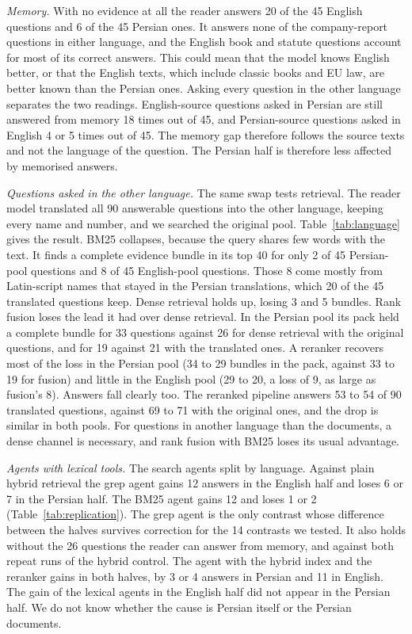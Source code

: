 \emph{Memory.} With no evidence at all the reader answers 20 of the 45 English questions and 6 of the 45 Persian ones. It answers none of the company-report questions in either language, and the English book and statute questions account for most of its correct answers. This could mean that the model knows English better, or that the English texts, which include classic books and EU law, are better known than the Persian ones. Asking every question in the other language separates the two readings. English-source questions asked in Persian are still answered from memory 18 times out of 45, and Persian-source questions asked in English 4 or 5 times out of 45. The memory gap therefore follows the source texts and not the language of the question. The Persian half is therefore less affected by memorised answers.

\emph{Questions asked in the other language.} The same swap tests retrieval. The reader model translated all 90 answerable questions into the other language, keeping every name and number, and we searched the original pool. Table~\ref{tab:language} gives the result. BM25 collapses, because the query shares few words with the text. It finds a complete evidence bundle in its top 40 for only 2 of 45 Persian-pool questions and 8 of 45 English-pool questions. Those 8 come mostly from Latin-script names that stayed in the Persian translations, which 20 of the 45 translated questions keep. Dense retrieval holds up, losing 3 and 5 bundles. Rank fusion loses the lead it had over dense retrieval. In the Persian pool its pack held a complete bundle for 33 questions against 26 for dense retrieval with the original questions, and for 19 against 21 with the translated ones. A reranker recovers most of the loss in the Persian pool (34 to 29 bundles in the pack, against 33 to 19 for fusion) and little in the English pool (29 to 20, a loss of 9, as large as fusion's 8). Answers fall clearly too. The reranked pipeline answers 53 to 54 of 90 translated questions, against 69 to 71 with the original ones, and the drop is similar in both pools. For questions in another language than the documents, a dense channel is necessary, and rank fusion with BM25 loses its usual advantage.

\emph{Agents with lexical tools.} The search agents split by language. Against plain hybrid retrieval the grep agent gains 12 answers in the English half and loses 6 or 7 in the Persian half. The BM25 agent gains 12 and loses 1 or 2 (Table~\ref{tab:replication}). The grep agent is the only contrast whose difference between the halves survives correction for the 14 contrasts we tested. It also holds without the 26 questions the reader can answer from memory, and against both repeat runs of the hybrid control. The agent with the hybrid index and the reranker gains in both halves, by 3 or 4 answers in Persian and 11 in English. The gain of the lexical agents in the English half did not appear in the Persian half. We do not know whether the cause is Persian itself or the Persian documents.

